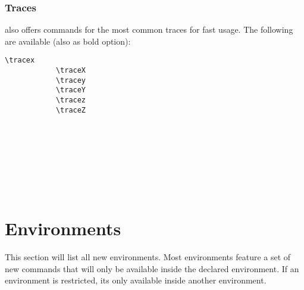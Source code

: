 \documentclass[10pt, a4paper]{article}
\begin{document}
	\subsubsection{Traces}
	\texttt{} also offers commands for the most common traces for fast usage. The following are available (also as bold option): 
	\begin{center}
		\begin{minipage}[h][3.2cm][t]{15em}
			\begin{lstlisting}[style=B]
			\tracex
			\traceX
			\tracey
			\traceY
			\tracez
			\traceZ	
			\end{lstlisting}
		\end{minipage}
		\begin{minipage}[h][3.2cm][t]{15em}
			\ \\
			\tracex\\
			\traceX\\
			\tracey\\
			\traceY\\
			\tracez\\
			\traceZ	
		\end{minipage}
	\end{center}
	\section{Environments}
	This section will list all new environments. Most environments feature a set of new commands that will only be available inside the declared environment. If an environment is restricted, its only available inside another environment.
\end{document}
